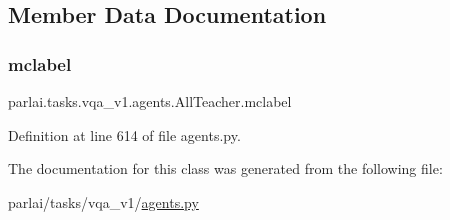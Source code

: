 \subsection{Member Data Documentation}
\mbox{\label{classparlai_1_1tasks_1_1vqa__v1_1_1agents_1_1AllTeacher_a195e6128ad37b6d0428866745c0490e3}} 
\subsubsection{\texorpdfstring{mclabel}{mclabel}}
{\footnotesize\ttfamily parlai.\+tasks.\+vqa\+\_\+v1.\+agents.\+All\+Teacher.\+mclabel}



Definition at line 614 of file agents.\+py.



The documentation for this class was generated from the following file\+:\begin{DoxyCompactItemize}
\item 
parlai/tasks/vqa\+\_\+v1/\hyperlink{parlai_2tasks_2vqa__v1_2agents_8py}{agents.\+py}\end{DoxyCompactItemize}
